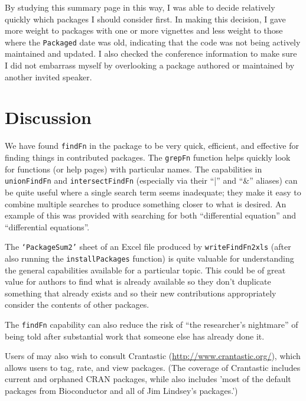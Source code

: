 By studying this summary page in this way, I was able to decide
relatively quickly which packages I should consider first.  In
making this decision, I gave more weight to packages with
one or more vignettes and less weight to those where the
{\tt Packaged} date was old, indicating that the code was not being
actively maintained and updated.  I also checked the conference
information to make sure I did not embarrass myself by overlooking
a package authored or maintained by another invited speaker.

\section{Discussion}
We have found {\tt findFn} in the  package to
be very quick, efficient, and effective for finding things in
contributed packages.  The {\tt grepFn} function helps quickly
look for functions (or help pages) with particular names.
The capabilities in {\tt unionFindFn} and {\tt intersectFindFn}
(especially via their ``|'' and ``\&'' aliases) can be quite useful
where a single search term seems inadequate;  they make it easy
to combine multiple searches to produce something closer to what
is desired.  An example of this was provided with searching for
both ``differential equation'' and ``differential equations''.

The {\tt `PackageSum2'} sheet of an Excel file produced by
{\tt writeFindFn2xls} (after also running the {\tt installPackages}
function) is quite valuable for understanding the
general capabilities available for a particular topic.
This could be of great value for authors to find what is already
available so they don't duplicate something that already exists
and so their new contributions appropriately consider
the contents of other packages.

The {\tt findFn} capability can also reduce the risk
of ``the researcher's nightmare'' of being told after
substantial work that someone else has already done it.

Users of  may also wish to consult Crantastic
(\url{http://www.crantastic.org/}), which allows users to tag, rate,
and view packages.  (The coverage of Crantastic includes current and
orphaned CRAN packages, while \cite{JB09URL}
also includes 'most of the default packages from Bioconductor and all
of Jim Lindsey's packages.')


